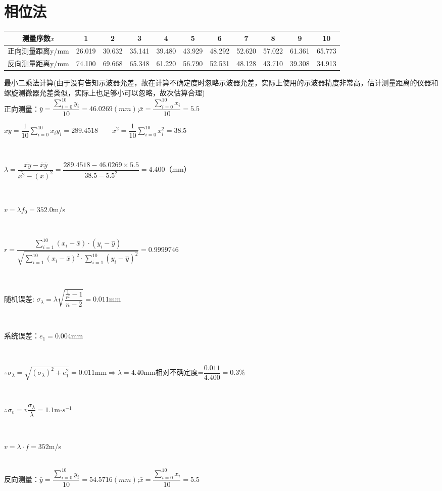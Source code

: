 \documentclass[1pt]{article}
\begin{document}
\section{相位法}
	\begin{center}
	\begin{tabular}{|c|c|c|c|c|c|c|c|c|c|c|}
	\hline
	测量序数$x$&1&2&3&4&5&6&7&8&9&10\\
	\hline
	正向测量距离y/mm&26.019&30.632&35.141&39.480&43.929&48.292&52.620&57.022&61.361&65.773\\
	\hline
	反向测量距离y/mm&74.100&69.668&65.348&61.220&56.790&52.531&48.128&43.710&39.308&34.913\\
	\hline
	\end{tabular}
	\end{center}
最小二乘法计算(由于没有告知示波器允差，故在计算不确定度时忽略示波器允差，实际上使用的示波器精度非常高，估计测量距离的仪器和螺旋测微器允差类似，实际上也足够小可以忽略，故次估算合理)\\
正向测量：\qquad $\bar{y}=\dfrac{\sum_{i=0}^{10}y_i}{10}=46.0269(mm)$;\qquad $\bar{x}=\dfrac{\sum_{i=0}^{10}x_i}{10}=5.5$\\
\centerline{$\overline{xy}=\dfrac{1}{10} \sum_{i=0}^{10} x_iy_i=289.4518
\qquad \bar{x^2}=\dfrac{1}{10} \sum_{i=0}^{10} x_i^2=38.5$}\\
\centerline{$\lambda = \dfrac{\overline{xy}-\bar{x}\bar{y}}{\overline{x^2}-(\bar{x})^2}=\dfrac{289.4518-46.0269\times5.5}{38.5-5.5^2}=4.400$（mm）}\\
\centerline{$v=\lambda f_0=352.0$m/s}\\
\centerline{$ r = \dfrac{\sum _{i=1}^{10}(x_{i} - \stackrel{-}{x})\cdot(y_{i} - \stackrel{-}{y})}{\sqrt{\sum _{i=1}^{10}(x_{i} - \stackrel{-}{x})^{2} \cdot \sum _{i=1}^{10}(y_{i} - \stackrel{-}{y})^{2}}} = 0.9999746$}\\
\centerline{随机误差: $\sigma_{\lambda} =  \lambda \sqrt{\dfrac{\frac{1}{r^{2}}-1}{n-2}}=0.011$mm}\\
\centerline{系统误差：$e_1=0.004$mm}\\
\centerline{$\therefore \sigma_\lambda = \sqrt{(\sigma_{\lambda})^2+e_1^2}=0.011$mm$\Rightarrow \lambda = 4.40$mm\qquad 相对不确定度=$\dfrac{0.011}{4.400}=0.3\%$}\\
\centerline{$\therefore \sigma_v = v \dfrac{\sigma_\lambda}{\lambda} =1.1 $m$\cdot s^{-1} $}\\
\centerline{$v=\lambda\cdot f = 352 $m/s}\\
反向测量：\qquad $\bar{y}=\dfrac{\sum_{i=0}^{10}y_i}{10}=54.5716(mm)$;\qquad $\bar{x}=\dfrac{\sum_{i=0}^{10}x_i}{10}=5.5$\\
\end{document}
